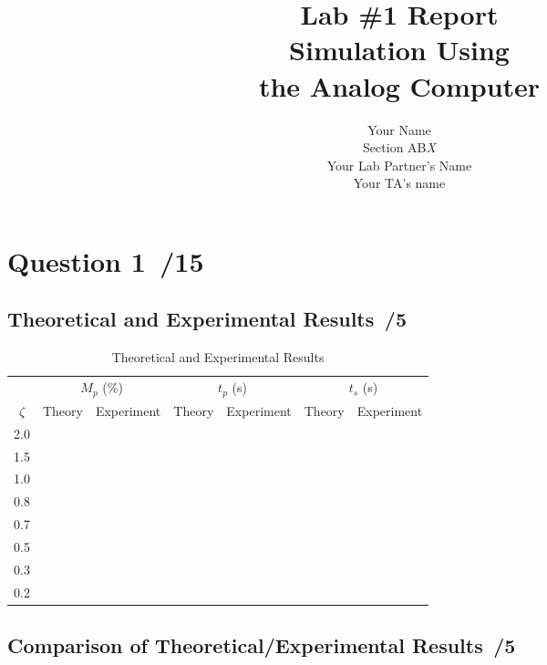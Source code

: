 \documentclass{article}
\newcommand{\score}{\hfill \underline{\hspace{0.65cm}}\,/} %
\begin{document}
\title{\bf Lab \#1 Report\\{\sc Simulation Using \\the Analog Computer}}
\author{Your Name\\ Section AB\emph{X}\\
  Your Lab Partner's Name\\
  Your TA's name}
\maketitle
\noindent {}
\section*{Question 1 \score 15}
\subsection*{Theoretical and Experimental Results \score 5}
\begin{table}[phtb]
  \begin{center}
    \caption{Theoretical and Experimental Results}
     \label{tbl:lab1_q1}
    \begin{tabular}{c|rr|rr|rr} \hline \hline
      & \multicolumn{2}{c}{$M_p$ (\%)} & \multicolumn{2}{c}{$t_p$ (s)} & \multicolumn{2}{c}{$t_s$ (s)} \\ \cline{2-7} %
      $\zeta$ & Theory & Experiment & Theory & Experiment & Theory & Experiment \\
      \hline
      2.0 & &&&&&\\ 
      1.5 & &&&&&\\
      1.0 & &&&&&\\
      0.8 & &&&&&\\
      0.7 & &&&&&\\
      0.5 & &&&&&\\
      0.3 & &&&&&\\
      0.2 & &&&&& \\ \hline 
    \end{tabular} 
    \end{center}
\end{table}
\subsection*{Comparison of Theoretical/Experimental Results \score 5}
\end{document}
